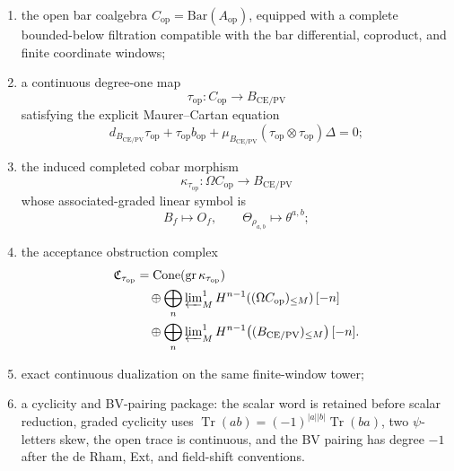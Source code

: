 \begin{defn}
\begin{enumerate}[label=(K\arabic*)]
      \[
        B_{\mathrm{CE/PV}}
          =
        C^\bullet_{\mathrm{CE},\mathrm{cont}}(\mathfrak g_{\mathrm{adm}})
          \cong
        \mathrm{PV}\bigl(
          \widehat{\mathbf S}_{\mathrm{coord}}(\mathfrak h_{\mathrm{adm}})
        \bigr),
      \]
      with the generator dictionary \(c^f\mapsto\theta^f\),
      \(u_f\mapsto O_f\);
    \item the open bar coalgebra
      \(C_{\mathrm{op}}=\mathrm{Bar}(A_{\mathrm{op}})\), equipped with a
      complete bounded-below filtration compatible with the bar
      differential, coproduct, and finite coordinate windows;
    \item a continuous degree-one map
      \[
        \tau_{\mathrm{op}}\colon
        C_{\mathrm{op}}\longrightarrow B_{\mathrm{CE/PV}}
      \]
      satisfying the explicit Maurer--Cartan equation
      \[
        d_{B_{\mathrm{CE/PV}}}\tau_{\mathrm{op}}
        +\tau_{\mathrm{op}} b_{\mathrm{op}}
        +\mu_{B_{\mathrm{CE/PV}}}
          (\tau_{\mathrm{op}}\otimes\tau_{\mathrm{op}})\Delta
        =0;
      \]
    \item the induced completed cobar morphism
      \[
        \kappa_{\tau_{\mathrm{op}}}\colon
        \Omega C_{\mathrm{op}}
        \longrightarrow
        B_{\mathrm{CE/PV}}
      \]
      whose associated-graded linear symbol is
      \[
        B_f\longmapsto O_f,\qquad
        \Theta_{\rho_{a,b}}\longmapsto\theta^{a,b};
      \]
    \item the acceptance obstruction complex
      \[
        \begin{aligned}
        \mathfrak C_{\tau_{\mathrm{op}}}
          &=
        \operatorname{Cone}(
          \operatorname{gr}\kappa_{\tau_{\mathrm{op}}})\\
          &\quad{}\oplus
        \bigoplus_n\varprojlim\nolimits^1_M
          H^{n-1}\!\left((\Omega C_{\mathrm{op}})_{\leq M}\right)[-n]\\
          &\quad{}\oplus
        \bigoplus_n\varprojlim\nolimits^1_M
          H^{n-1}\!\left((B_{\mathrm{CE/PV}})_{\leq M}\right)[-n].
        \end{aligned}
      \]
    \item exact continuous dualization on the same finite-window tower;
    \item a cyclicity and BV-pairing package: the scalar word is retained
      before scalar reduction, graded cyclicity uses
      \(\operatorname{Tr}(ab)=(-1)^{|a||b|}\operatorname{Tr}(ba)\),
      two \(\psi\)-letters skew, the open trace is continuous, and the
      BV pairing has degree \(-1\) after the de Rham, Ext, and field-shift
      conventions.
  \end{enumerate}
\end{defn}

